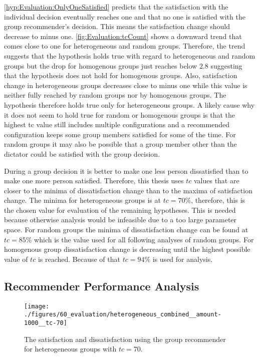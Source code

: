 \autoref{hyp:Evaluation:OnlyOneSatisfied} predicts that the satisfaction with the individual decision eventually reaches one and that no one is satisfied with the group recommender's decision. This means the satisfaction change should decrease to minus one. \autoref{fig:Evaluation:tcCount} shows a downward trend that comes close to one for heterogeneous and random groups. Therefore, the trend suggests that the hypothesis holds true with regard to heterogeneous and random groups but the drop for homogenous groups just reaches below $2.8$ suggesting that the hypothesis does not hold for homogenous groups. Also, satisfaction change in heterogeneous groups decreases close to minus one while this value is neither fully reached by random groups nor by homogenous groups. The hypothesis therefore holds true only for heterogeneous groups. A likely cause why it does not seem to hold true for random or homogenous groups is that the highest tc value still includes multiple configurations and a recommended configuration keeps some group members satisfied for some of the time. For random groups it may also be possible that a group member other than the dictator could be satisfied with the group decision.

During a group decision it is better to make one less person dissatisfied than to make one more person satisfied. Therefore, this thesis uses $tc$ values that are closer to the minima of dissatisfaction change than to the maxima of satisfaction change. The minima for heterogeneous groups is at $tc = 70\%$, therefore, this is the chosen value for evaluation of the remaining hypotheses. This is needed because otherwise analysis would be infeasible due to a too large parameter space. For random groups the minima of dissatisfaction change can be found at $tc = 85\%$ which is the value used for all following analyses of random groups. For homogenous group dissatisfaction change is decreasing until the highest possible value of $tc$ is reached. Because of that $tc = 94\%$ is used for analysis.

\subsection{Recommender Performance Analysis}

\begin{figure}[p]
    \centering
    \texttt{[image: ./figures/60\_evaluation/heterogeneous\_combined\_\_amount-1000\_\_tc-70]}
    \caption{The satisfaction and dissatisfaction using the group recommender for heterogeneous groups with $tc = 70$.}
    \label{fig:Evaluation:HeteroSatisfaction}
\end{figure}

